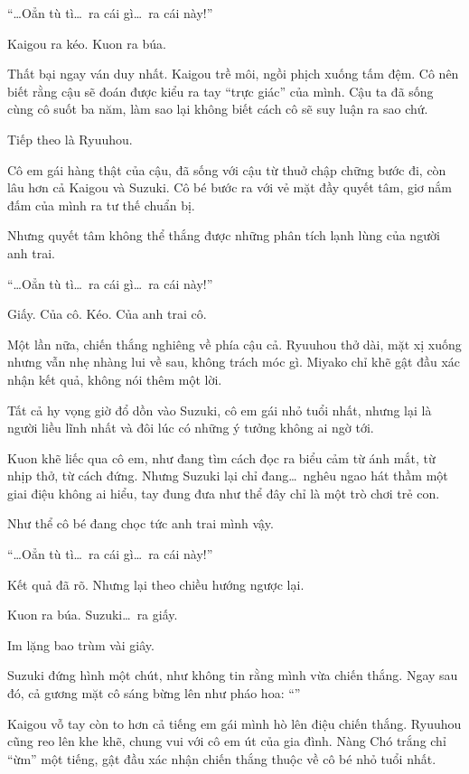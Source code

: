 \documentclass[../main.tex]{subfiles}
\begin{document}
``\dots Oẳn tù tì\dots\ ra cái gì\dots\ ra cái này!''

Kaigou ra kéo. Kuon ra búa.

Thất bại ngay ván duy nhất. Kaigou trề môi, ngồi phịch xuống tấm đệm. Cô nên biết rằng cậu sẽ đoán được kiểu ra tay ``trực giác'' của mình. Cậu ta đã sống cùng cô suốt ba năm, làm sao lại không biết cách cô sẽ suy luận ra sao chứ.

Tiếp theo là Ryuuhou.

Cô em gái hàng thật của cậu, đã sống với cậu từ thuở chập chững bước đi, còn lâu hơn cả Kaigou và Suzuki. Cô bé bước ra với vẻ mặt đầy quyết tâm, giơ nắm đấm của mình ra tư thế chuẩn bị.

Nhưng quyết tâm không thể thắng được những phân tích lạnh lùng của người anh trai.

``\dots Oẳn tù tì\dots\ ra cái gì\dots\ ra cái này!''

Giấy. Của cô. Kéo. Của anh trai cô.

Một lần nữa, chiến thắng nghiêng về phía cậu cả. Ryuuhou thở dài, mặt xị xuống nhưng vẫn nhẹ nhàng lui về sau, không trách móc gì. Miyako chỉ khẽ gật đầu xác nhận kết quả, không nói thêm một lời.

Tất cả hy vọng giờ đổ dồn vào Suzuki, cô em gái nhỏ tuổi nhất, nhưng lại là người liều lĩnh nhất và đôi lúc có những ý tưởng không ai ngờ tới.

Kuon khẽ liếc qua cô em, như đang tìm cách đọc ra biểu cảm từ ánh mắt, từ nhịp thở, từ cách đứng. Nhưng Suzuki lại chỉ đang\dots\ nghêu ngao hát thầm một giai điệu không ai hiểu, tay đung đưa như thể đây chỉ là một trò chơi trẻ con.

Như thể cô bé đang chọc tức anh trai mình vậy.

``\dots Oẳn tù tì\dots\ ra cái gì\dots\ ra cái này!''

Kết quả đã rõ. Nhưng lại theo chiều hướng ngược lại.

Kuon ra búa. Suzuki\dots\ ra giấy.

Im lặng bao trùm vài giây.

Suzuki đứng hình một chút, như không tin rằng mình vừa chiến thắng. Ngay sau đó, cả gương mặt cô sáng bừng lên như pháo hoa: ``\textbf{}''

Kaigou vỗ tay còn to hơn cả tiếng em gái mình hò lên điệu chiến thắng. Ryuuhou cũng reo lên khe khẽ, chung vui với cô em út của gia đình. Nàng Chó trắng chỉ ``ừm'' một tiếng, gật đầu xác nhận chiến thắng thuộc về cô bé nhỏ tuổi nhất.
\end{document}
